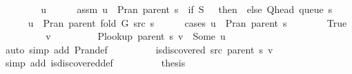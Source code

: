 \begin{isabellebody}
\ \ \isamarkupfalse%
\isanewline
\ \ \ \ \isamarkupfalse%
\ u\isanewline
\ \ \ \ \isamarkupfalse%
\ assm{\isacharcolon}{\kern0pt}\ {\isachardoublequoteopen}u\ {\isasymin}\ P{\isachardot}{\kern0pt}ran\ {\isacharparenleft}{\kern0pt}parent\ s{\isacharparenright}{\kern0pt}\ {\isasymunion}\ {\isacharparenleft}{\kern0pt}if\ {\isacharquery}{\kern0pt}S\ {\isacharequal}{\kern0pt}\ {\isacharbraceleft}{\kern0pt}{\isacharbraceright}{\kern0pt}\ then\ {\isacharbraceleft}{\kern0pt}{\isacharbraceright}{\kern0pt}\ else\ {\isacharbraceleft}{\kern0pt}Q{\isacharunderscore}{\kern0pt}head\ {\isacharparenleft}{\kern0pt}queue\ s{\isacharparenright}{\kern0pt}{\isacharbraceright}{\kern0pt}{\isacharparenright}{\kern0pt}{\isachardoublequoteclose}\isanewline
\ \ \ \ \isamarkupfalse%
\ {\isachardoublequoteopen}u\ {\isasymin}\ P{\isachardot}{\kern0pt}ran\ {\isacharparenleft}{\kern0pt}parent\ {\isacharparenleft}{\kern0pt}fold\ G\ src\ s{\isacharparenright}{\kern0pt}{\isacharparenright}{\kern0pt}{\isachardoublequoteclose}\isanewline
\ \ \ \ \isamarkupfalse%
\ {\isacharparenleft}{\kern0pt}cases\ {\isachardoublequoteopen}u\ {\isasymin}\ P{\isachardot}{\kern0pt}ran\ {\isacharparenleft}{\kern0pt}parent\ s{\isacharparenright}{\kern0pt}{\isachardoublequoteclose}{\isacharparenright}{\kern0pt}\isanewline
\ \ \ \ \ \ \isamarkupfalse%
\ True\isanewline
\ \ \ \ \ \ \isamarkupfalse%
\ \isamarkupfalse%
\ v\ \isanewline
\ \ \ \ \ \ \ \ {\isachardoublequoteopen}P{\isacharunderscore}{\kern0pt}lookup\ {\isacharparenleft}{\kern0pt}parent\ s{\isacharparenright}{\kern0pt}\ v\ {\isacharequal}{\kern0pt}\ Some\ u{\isachardoublequoteclose}\isanewline
\ \ \ \ \ \ \ \ \isamarkupfalse%
\ {\isacharparenleft}{\kern0pt}auto\ simp\ add{\isacharcolon}{\kern0pt}\ P{\isachardot}{\kern0pt}ran{\isacharunderscore}{\kern0pt}def{\isacharparenright}{\kern0pt}\isanewline
\ \ \ \ \ \ \isamarkupfalse%
\ \isamarkupfalse%
\ {\isachardoublequoteopen}is{\isacharunderscore}{\kern0pt}discovered\ src\ {\isacharparenleft}{\kern0pt}parent\ s{\isacharparenright}{\kern0pt}\ v{\isachardoublequoteclose}\isanewline
\ \ \ \ \ \ \ \ \isamarkupfalse%
\ {\isacharparenleft}{\kern0pt}simp\ add{\isacharcolon}{\kern0pt}\ is{\isacharunderscore}{\kern0pt}discovered{\isacharunderscore}{\kern0pt}def{\isacharparenright}{\kern0pt}\isanewline
\ \ \ \ \ \ \isamarkupfalse%
\ \isamarkupfalse%
\ {\isacharquery}{\kern0pt}thesis\isanewline

\end{isabellebody}
